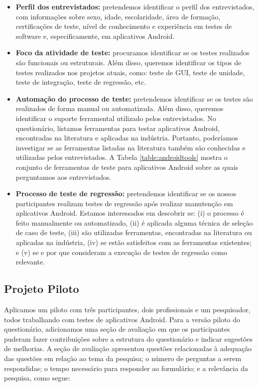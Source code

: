\begin{itemize}
    \item \textbf{Perfil dos entrevistados:} pretendemos identificar o perfil dos entrevistados, com informações sobre sexo, idade, escolaridade, área de formação, certificações de teste, nível de conhecimento e experiência em testes de software e, especificamente, em aplicativos Android.
    
    \item \textbf{Foco da atividade de teste:} procuramos identificar se os testes realizados são funcionais ou estruturais. Além disso, queremos identificar os tipos de testes realizados nos projetos atuais, como: teste de \ac{GUI}, teste de unidade, teste de integração, teste de regressão, etc.
    
    \item \textbf{Automação do processo de teste:} pretendemos identificar se os testes são realizados de forma manual ou automatizada. Além disso, queremos identificar o suporte ferramental utilizado pelos entrevistados. No questionário, listamos ferramentas para testar aplicativos Android, encontradas na literatura e aplicadas na indústria. Portanto, poderíamos investigar se as ferramentas listadas na literatura também são conhecidas e utilizadas pelos entrevistados. A Tabela \ref{table:androidtools} mostra o conjunto de ferramentas de teste para aplicativos Android sobre as quais perguntamos aos entrevistados.
    
    \item \textbf{Processo de teste de regressão:} pretendemos identificar se os nossos participantes realizam testes de regressão após realizar manutenção em aplicativos Android. Estamos interessados em descobrir se: (i) o processo é feito manualmente ou automatizado, (ii) é aplicada alguma técnica de seleção de caso de teste, (iii) são utilizadas ferramentas, encontradas na literatura ou aplicadas na indústria, (iv) se estão satisfeitos com as ferramentas existentes; e (v) se e por que consideram a execução de testes de regressão como relevante.
    
\end{itemize}

\subsection{Projeto Piloto}

Aplicamos um piloto com três participantes, dois profissionais e um pesquisador, todos trabalhando com testes de aplicativos Android. Para a versão piloto do questionário, adicionamos uma seção de avaliação em que os participantes puderam fazer contribuições sobre a estrutura do questionário e indicar sugestões de melhorias. A seção de avaliação apresentou questões relacionadas à adequação das questões em relação ao tema da pesquisa; o número de perguntas a serem respondidas; o tempo necessário para responder ao formulário; e a relevância da pesquisa, como segue:


